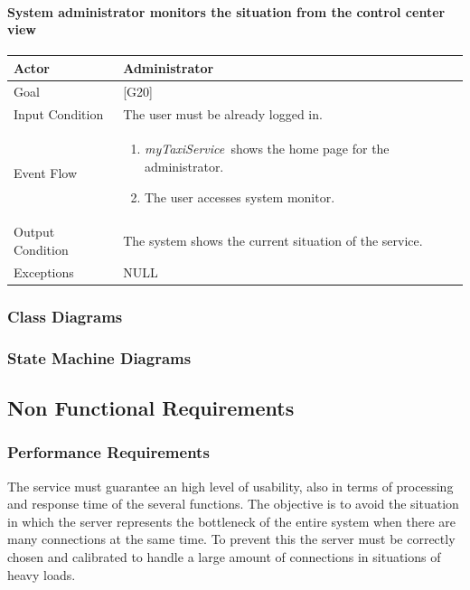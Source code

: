 \documentclass[a4paper,11pt]{report} %
\newcommand{\mts}{\mbox{\normalfont\itshape myTaxiService\ }}
\begin{document}
	\pagebreak
	
	\paragraph{System administrator monitors the situation from the control center view}
	\begin{center}
		\begin{tabular}{| l | p{9cm} |}\hline
			Actor & Administrator\\\hline
			Goal & {[}G20{]} \\\hline
			Input Condition & The user must be already logged in.\\\hline
			Event Flow & \begin{enumerate}
				\item \mts shows the home page for the administrator.
				\item The user accesses system monitor.	
			\end{enumerate}\\\hline
			Output Condition & The system shows the current situation of the service.\\\hline
			Exceptions & NULL\\\hline
		\end{tabular}
	\end{center}
	
	\pagebreak		
	
	\pagebreak	
	
	\subsubsection{Class Diagrams}
	
	\pagebreak
	
	\subsubsection{State Machine Diagrams}
	
	\pagebreak
		
	\subsection{Non Functional Requirements}
	
	\subsubsection{Performance Requirements} The service must guarantee an high level of usability, also in terms of processing and response time of the several functions. The objective is to avoid the situation in which the server represents the bottleneck of the entire system when there are many connections at the same time. To prevent this the server must be correctly chosen and calibrated to handle a large amount of connections in situations of heavy loads. 
	
\end{document}
